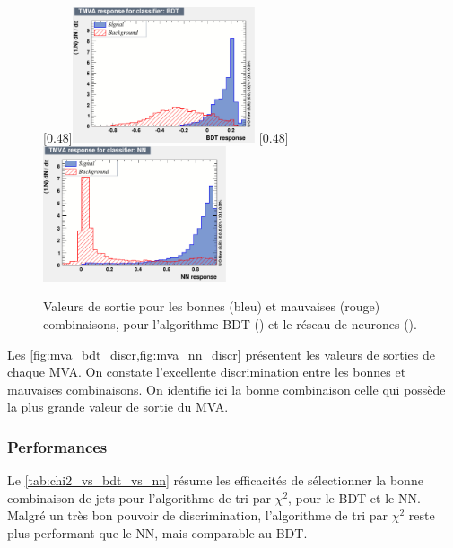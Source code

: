 \bigskip

\begin{figure}[tbp] \centering
    \subcaptionbox{\label{fig:mva_bdt_discr}}[0.48\textwidth]{\includegraphics[width=0.48\textwidth]{chapitre6/figs/mva/mva_BDT.pdf}}
    \subcaptionbox{\label{fig:mva_nn_discr}}[0.48\textwidth]{\includegraphics[width=0.48\textwidth]{chapitre6/figs/mva/mva_NN.pdf}}
    \caption{Valeurs de sortie pour les bonnes (bleu) et mauvaises (rouge) combinaisons, pour l'algorithme BDT () et le réseau de neurones ().}
\end{figure}

Les \cref{fig:mva_bdt_discr,fig:mva_nn_discr} présentent les valeurs de sorties de chaque MVA. On constate l'excellente discrimination entre les bonnes et mauvaises combinaisons. On identifie ici la bonne combinaison celle qui possède la plus grande valeur de sortie du MVA.

\subsubsection{Performances}

Le \cref{tab:chi2_vs_bdt_vs_nn} résume les efficacités de sélectionner la bonne combinaison de jets pour l'algorithme de tri par $\chi^2$, pour le BDT et le NN. Malgré un très bon pouvoir de discrimination, l'algorithme de tri par $\chi^2$ reste plus performant que le NN, mais comparable au BDT.

